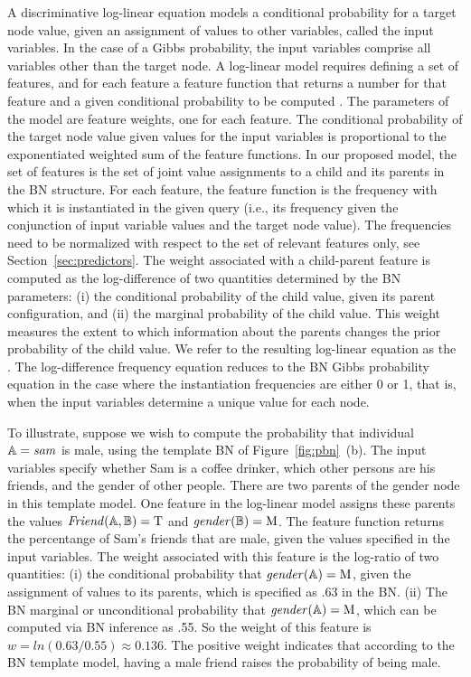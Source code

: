 \documentclass[twoside,11pt]{article}
\begin{document}
A discriminative log-linear equation models a conditional probability for a target node value, given an assignment of values to other variables, called the input variables. In the case of a Gibbs probability, the input variables comprise all variables other than the target node. A log-linear model requires defining a set of features, and for each feature a feature function that returns a number for that feature and a given conditional probability to be computed \cite{Sutton2007}. The parameters of the model are feature weights, one for each feature. The conditional probability of the target node value given values for the input variables is proportional to the exponentiated weighted sum of the feature functions. In our proposed model, the set of features is the set of joint value assignments to a child and its parents in the BN structure. For each feature, the feature function is the frequency with which it is instantiated in the given query (i.e., its frequency given the conjunction of input variable values and the target node value). The frequencies need to be normalized with respect to the set of relevant features only, see Section~\ref{sec:predictors}.  The weight associated with a child-parent feature is computed as the log-difference of two quantities determined by the BN parameters: (i) the conditional probability of the child value, given its parent configuration, and (ii) the marginal probability of the child value. This weight measures the extent to which information about the parents changes the prior probability of the child value. We refer to the resulting log-linear equation as the . The log-difference frequency equation reduces to the BN Gibbs probability equation in the case where the instantiation frequencies are either 0 or 1, that is, when the input variables determine a unique value for each node. 



To illustrate, suppose we wish to compute the probability that individual $\mathbb{A} = \it{sam}$ is male, using the template BN of Figure~\ref{fig:pbn}~(b). The input variables specify whether Sam is a coffee drinker, which other persons are his friends, and the gender of other people. There are two parents of the gender node in this template model. One feature in the log-linear model assigns these parents the values $\it{Friend}(\mathbb{A},\mathbb{B}) = \mathrm{T}$ and $\it{gender}(\mathbb{B}) = \mathrm{M}$. The feature function returns the percentange of Sam's friends that are male, given the values specified in the input variables. The weight associated with this feature is the log-ratio of two quantities: (i) the conditional probability that $\it{gender}(\mathbb{A}) = \mathrm{M}$, given the assignment of values to its parents, which is specified as .63 in the BN. (ii) The BN marginal or unconditional probability that $\it{gender}(\mathbb{A}) = \mathrm{M}$, which can be computed via BN inference as .55. So the weight of this feature is $w = ln(0.63/0.55) \approx 0.136$. The positive weight indicates that according to the BN template model, having a male friend raises the probability of being male.
\end{document}
